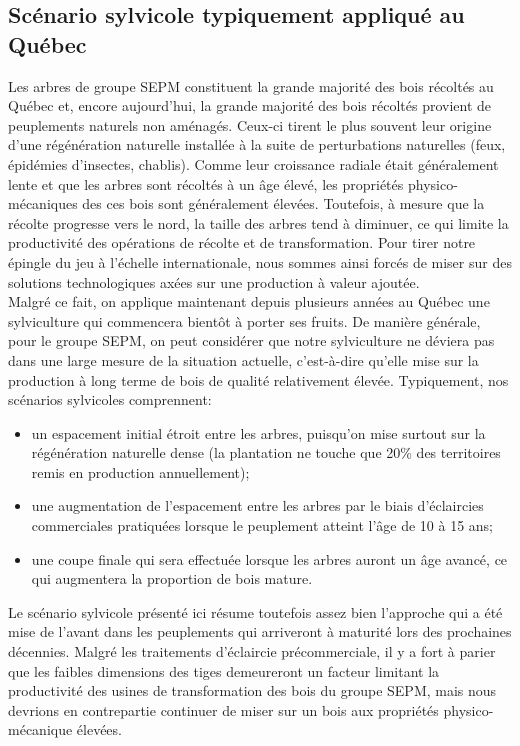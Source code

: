 \subsection{Scénario sylvicole typiquement appliqué au Québec}

Les arbres de groupe SEPM constituent la grande majorité des bois récoltés au Québec et, encore aujourd'hui, la grande majorité des bois récoltés provient de peuplements naturels non aménagés. Ceux-ci tirent le plus souvent leur origine d'une régénération naturelle installée à la suite de perturbations naturelles (feux, épidémies d'insectes, chablis). Comme leur croissance radiale était généralement lente et que les arbres sont récoltés à un âge élevé, les propriétés physico-mécaniques des ces bois sont généralement élevées. Toutefois, à mesure que la récolte progresse vers le nord, la taille des arbres tend à diminuer, ce qui limite la productivité des opérations de récolte et de transformation. Pour tirer notre épingle du jeu à l'échelle internationale, nous sommes ainsi \og forcés \fg de miser sur des solutions technologiques axées sur une production à valeur ajoutée.\\

Malgré ce fait, on applique maintenant depuis plusieurs années au Québec une sylviculture qui commencera bientôt à porter ses fruits. De manière générale, pour le groupe SEPM, on peut considérer que notre sylviculture ne déviera pas dans une large mesure de la situation actuelle, c'est-à-dire qu'elle mise sur la production à long terme de bois de qualité relativement élevée. Typiquement, nos scénarios sylvicoles comprennent:

\begin{itemize}
	\item un espacement initial étroit entre les arbres, puisqu'on mise surtout sur la régénération naturelle dense (la plantation ne touche que 20\% des territoires remis en production annuellement);
	\item une augmentation de l'espacement entre les arbres par le biais d'éclaircies commerciales pratiquées lorsque le peuplement atteint l'âge de 10 à 15 ans;
	\item une coupe finale qui sera effectuée lorsque les arbres auront un âge avancé, ce qui augmentera la proportion de bois mature.
\end{itemize} 

Le scénario sylvicole présenté ici résume toutefois assez bien l'approche qui a été mise de l'avant dans les peuplements qui arriveront à maturité lors des prochaines décennies. Malgré les traitements d'éclaircie précommerciale, il y a fort à parier que les faibles dimensions des tiges demeureront un facteur limitant la productivité des usines de transformation des bois du groupe SEPM, mais nous devrions en contrepartie continuer de miser sur un bois aux propriétés physico-mécanique élevées.\\

